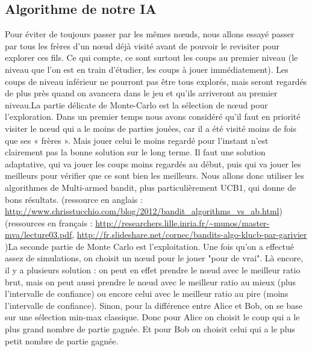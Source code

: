 \subsection {Algorithme de notre IA}Pour éviter de toujours passer par les mêmes nœuds, nous allons essayé passer par tous les frères d’un nœud déjà visité avant de pouvoir le revisiter pour explorer ces fils. Ce qui compte, ce sont surtout les coups au premier niveau (le niveau que l’on est en train d’étudier, les coups à jouer immédiatement). Les coups de niveau inférieur ne pourront pas être tous explorés, mais seront regardés de plus près quand on avancera dans le jeu et qu'ils arriveront au premier niveau.La partie délicate de Monte-Carlo est la sélection de nœud pour l'exploration.
 Dans un premier temps nous avons considéré  qu’il faut en priorité visiter le nœud qui a le moins de parties jouées, car il a été visité moins de fois que ses « frères ». Mais jouer celui le moins regardé pour l'instant n'est clairement pas la bonne solution sur le long terme. Il faut une solution adaptative, qui va jouer les coups moins regardés au début, puis qui va jouer les meilleurs pour vérifier que ce sont bien les meilleurs. Nous allons donc utiliser les algorithmes de Multi-armed bandit, plus particulièrement UCB1, qui donne de bons résultats.
(ressource en anglais : \url{http://www.chrisstucchio.com/blog/2012/bandit_algorithms_vs_ab.html})(ressources en français : \url{http://researchers.lille.inria.fr/~munos/master-mva/lecture03.pdf},
 \url{http://fr.slideshare.net/cornec/bandits-algo-klucb-par-garivier} )La seconde partie de Monte Carlo est l'exploitation. Une fois qu'on a effectué assez de simulations, on choisit un nœud pour le jouer "pour de vrai". Là encore, il y a plusieurs solution : on peut en effet prendre le nœud avec le meilleur ratio brut, mais on peut aussi prendre le nœud avec le meilleur ratio au mieux (plus l'intervalle de confiance) ou encore celui avec le meilleur ratio au pire (moins l'intervalle de confiance). Sinon, pour la différence entre Alice et Bob, on se base sur une sélection min-max classique. Donc pour Alice on choisit le coup qui a le plus grand nombre de partie gagnée. Et pour Bob on choisit celui qui a le plus petit nombre de partie gagnée. 
